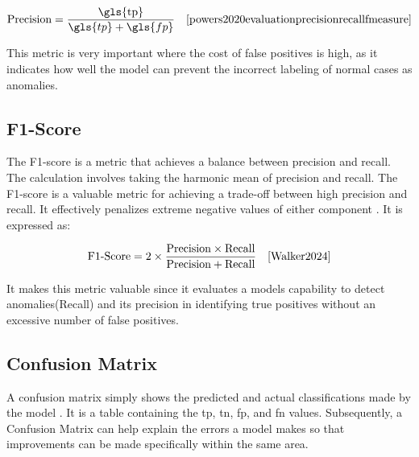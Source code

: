\begin{equation}
    \text{Precision} = \frac{\text{\gls{tp}}}{\gls{tp} + \gls{fp}} \quad \text{\cite{powers2020evaluationprecisionrecallfmeasure}}
    \label{eq:precision}
\end{equation}

This metric is very important where the cost of false positives is high, as it indicates how well the model can prevent the incorrect labeling of normal cases as anomalies. 

\subsection*{F1-Score}
\label{subsec:F1-Score}

The F1-score is a metric that achieves a balance between precision and recall. The calculation involves taking the harmonic mean of precision and recall. The F1-score is a valuable metric for achieving a trade-off between high precision and recall. It effectively penalizes extreme negative values of either component \cite{Walker2024}. It is expressed as:

\begin{equation}
\text{F1-Score} = 2 \times \frac{\text{Precision} \times \text{Recall}}{\text{Precision} + \text{Recall}} \quad \text{\cite{Walker2024}}
\end{equation}

It makes this metric valuable since it evaluates a models capability to detect anomalies(Recall) and its precision in identifying true positives without an excessive number of false positives. 

\subsection*{Confusion Matrix}
\label{subsec:Confusion Matrix}

A confusion matrix simply shows the predicted and actual classifications made by the model \cite{Kohavi1998}. It is a table containing the \gls{tp}, \gls{tn}, \gls{fp}, and \gls{fn} values. Subsequently, a Confusion Matrix can help explain the errors a model makes so that improvements can be made specifically within the same area.


